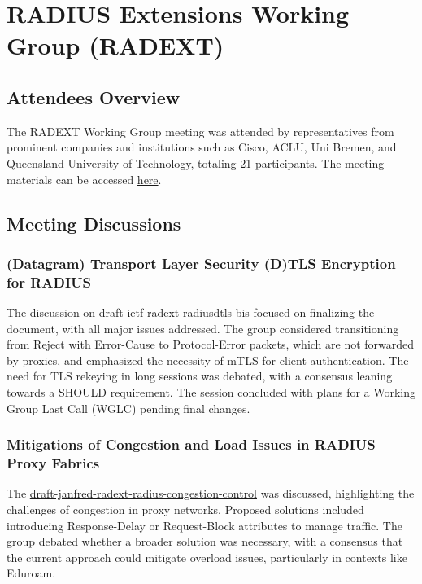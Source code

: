 \documentclass{article}
\begin{document}
\newpage

\section{RADIUS Extensions Working Group (RADEXT)} 

\subsection{Attendees Overview}
The RADEXT Working Group meeting was attended by representatives from prominent companies and institutions such as Cisco, ACLU, Uni Bremen, and Queensland University of Technology, totaling 21 participants. The meeting materials can be accessed \href{https://datatracker.ietf.org/meeting/122/materials/agenda-122-radext}{here}.

\subsection{Meeting Discussions}

\subsubsection{(Datagram) Transport Layer Security (D)TLS Encryption for RADIUS}
The discussion on \href{https://datatracker.ietf.org/doc/html/draft-ietf-radext-radiusdtls-bis}{draft-ietf-radext-radiusdtls-bis} focused on finalizing the document, with all major issues addressed. The group considered transitioning from Reject with Error-Cause to Protocol-Error packets, which are not forwarded by proxies, and emphasized the necessity of mTLS for client authentication. The need for TLS rekeying in long sessions was debated, with a consensus leaning towards a SHOULD requirement. The session concluded with plans for a Working Group Last Call (WGLC) pending final changes.

\subsubsection{Mitigations of Congestion and Load Issues in RADIUS Proxy Fabrics}
The \href{https://datatracker.ietf.org/doc/html/draft-janfred-radext-radius-congestion-control}{draft-janfred-radext-radius-congestion-control} was discussed, highlighting the challenges of congestion in proxy networks. Proposed solutions included introducing Response-Delay or Request-Block attributes to manage traffic. The group debated whether a broader solution was necessary, with a consensus that the current approach could mitigate overload issues, particularly in contexts like Eduroam.
\end{document}
